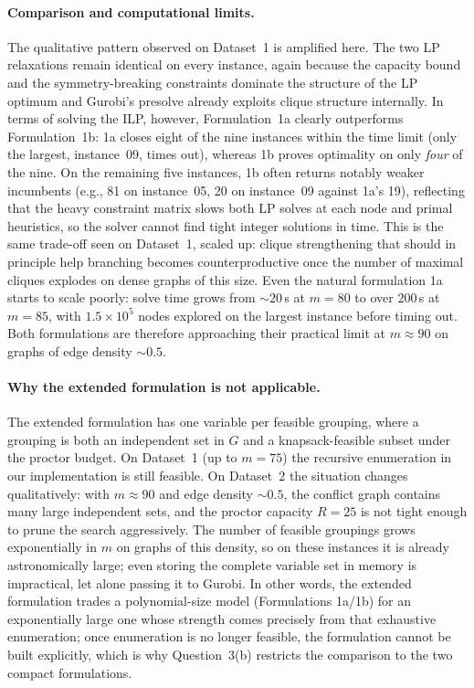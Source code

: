 \documentclass{article}
\begin{document}
\paragraph{Comparison and computational limits.}
The qualitative pattern observed on Dataset~1 is amplified here. The two LP
relaxations remain identical on every instance, again because the capacity bound and
the symmetry-breaking constraints dominate the structure of the LP optimum and
Gurobi's presolve already exploits clique structure internally. In terms of solving the
ILP, however, Formulation~1a clearly outperforms Formulation~1b: 1a closes eight of
the nine instances within the time limit (only the largest, instance~09, times out),
whereas 1b proves optimality on only \emph{four} of the nine. On the remaining five
instances, 1b often returns notably weaker incumbents (e.g., 81 on instance~05, 20 on
instance~09 against 1a's 19), reflecting that the heavy constraint matrix slows both
LP solves at each node and primal heuristics, so the solver cannot find tight integer
solutions in time.
This is the same trade-off seen on Dataset~1, scaled up: clique strengthening that
should in principle help branching becomes counterproductive once the number of maximal
cliques explodes on dense graphs of this size. Even the natural formulation 1a starts
to scale poorly: solve time grows from $\sim\!20$\,s at $m = 80$ to over $200$\,s at
$m = 85$, with $1.5\!\times\!10^5$ nodes explored on the largest instance before
timing out. Both formulations are therefore approaching their practical limit at
$m \approx 90$ on graphs of edge density $\sim\!0.5$.

\paragraph{Why the extended formulation is not applicable.}
The extended formulation has one variable per feasible grouping, where a grouping is
both an independent set in $G$ and a knapsack-feasible subset under the proctor budget.
On Dataset~1 (up to $m = 75$) the recursive enumeration in our implementation is still
feasible. On Dataset~2 the situation changes qualitatively: with $m \approx 90$ and
edge density $\sim\!0.5$, the conflict graph contains many large independent sets, and
the proctor capacity $R = 25$ is not tight enough to prune the search aggressively.
The number of feasible groupings grows exponentially in $m$ on graphs of this density,
so on these instances it is already astronomically large; even storing the complete
variable set in memory is impractical, let alone passing it to Gurobi. In other words, the extended formulation trades a polynomial-size model
(Formulations 1a/1b) for an exponentially large one whose strength comes precisely
from that exhaustive enumeration; once enumeration is no longer feasible, the
formulation cannot be built explicitly, which is why Question~3(b) restricts the
comparison to the two compact formulations.
\end{document}
